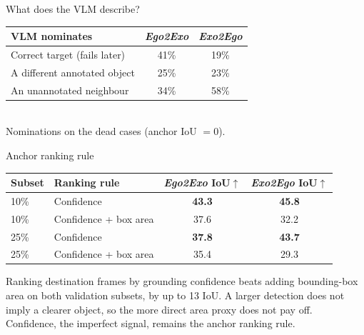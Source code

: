 \documentclass[professionalfonts,aspectratio=169]{beamer}
\begin{document}
\begin{frame}[t]
\begin{center}
{\large What does the VLM describe?}
\end{center}
\vfill
\centering
    \small
    \begin{tabular}{lcc}
      \toprule
      VLM nominates & \textit{Ego2Exo} & \textit{Exo2Ego} \\
      \midrule
      Correct target (fails later)   & 41\% & 19\% \\
      A different annotated object   & 25\% & 23\% \\
      An unannotated neighbour       & 34\% & 58\% \\
      \bottomrule
    \end{tabular}
    \\[0.6em]
    {\scriptsize Nominations on the dead cases (anchor IoU $=0$).}
\vfill
\end{frame}

\begin{frame}[t]
\begin{center}
{\large Anchor ranking rule}
\end{center}
\vfill
\begin{center}
\small
\setlength{\tabcolsep}{8pt}
\begin{tabular}{llcc}
  \toprule
  Subset & Ranking rule & \textit{Ego2Exo} IoU$\uparrow$ & \textit{Exo2Ego} IoU$\uparrow$ \\
  \midrule
  10\% & Confidence            & \textbf{43.3} & \textbf{45.8} \\
  10\% & Confidence + box area & 37.6 & 32.2 \\
  \midrule
  25\% & Confidence            & \textbf{37.8} & \textbf{43.7} \\
  25\% & Confidence + box area & 35.4 & 29.3 \\
  \bottomrule
\end{tabular}
\end{center}
\vspace{0.8em}
\begin{center}
\begin{minipage}{0.88\textwidth}
\small
Ranking destination frames by grounding confidence beats adding bounding-box area on both validation subsets, by up to 13 IoU. A larger detection does not imply a clearer object, so the more direct area proxy does not pay off. Confidence, the imperfect signal, remains the anchor ranking rule.
\end{minipage}
\end{center}
\vfill
\end{frame}
\end{document}
